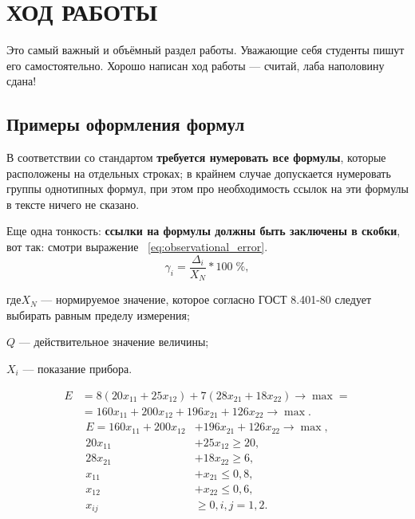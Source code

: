 \section{ХОД РАБОТЫ}

Это самый важный и объёмный раздел работы. Уважающие себя студенты пишут его самостоятельно.
Хорошо написан ход работы --- считай, лаба наполовину сдана!


\subsection{Примеры оформления формул}

В соответствии со стандартом \textbf{требуется нумеровать все 
формулы}, которые расположены на отдельных строках; в крайнем случае допускается нумеровать
группы однотипных формул, при этом про необходимость ссылок на эти формулы в тексте ничего не сказано.

Еще одна тонкость: \textbf{ссылки на формулы должны быть заключены в скобки}, вот так: смотри выражение ~\eqref{eq:observational_error}.
\begin{equation}
  \label{eq:observational_error}
  \gamma_{i} = \dfrac{\Delta_{i}}{X_{N}}*100\;\%,
\end{equation}

\noindent где\hspace{1em}$ X_{N} $ --- нормируемое значение, которое согласно ГОСТ 8.401-80
следует выбирать равным пределу измерения;

$ Q $ --- действительное значение величины;

$ X_{i} $ --- показание прибора.

\begin{equation}
  \label{eq:BaseOpt}
  \begin{aligned}
    E &= 8(20x_{11} + 25x_{12}) + 7(28x_{21} + 18x_{22}) \rightarrow \max = \\
    &= 160x_{11} + 200x_{12} + 196x_{21} + 126x_{22} \rightarrow \max.
  \end{aligned}
\end{equation}
\begin{equation}
  \label{eq:BaseNSM}
    \begin{aligned}
      E = 160x_{11} + 200x_{12} &+ 196x_{21} + 126x_{22} \rightarrow \max, \\
      20x_{11} &+ 25x_{12} \ge 20, \\
      28x_{21} &+ 18x_{22} \ge 6, \\
      x_{11} &+ x_{21} \le 0{,}8, \\
      x_{12} &+ x_{22} \le 0{,}6, \\
      x_{ij} & \ge 0, i, j = 1, 2.
    \end{aligned}
\end{equation}

